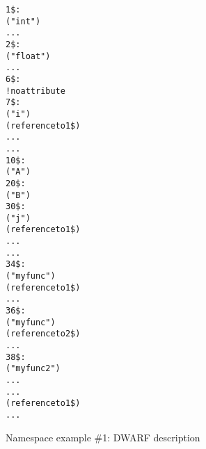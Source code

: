 \begin{figure}[p]
\begin{dwflisting}
\begin{alltt}

1\$:  \DWTAGbasetype
        \DWATname("int")
        ...
2\$:  \DWTAGbasetype
        \DWATname("float")
        ...
6\$:  \DWTAGnamespace
        ! no \DWATname attribute
7\$:
        \DWTAGvariable
            \DWATname("i")
            \DWATtype(reference to 1\$)
            \DWATlocation ...
            ...
10\$: \DWTAGnamespace
        \DWATname("A")
20\$:    \DWTAGnamespace
            \DWATname("B")
30\$:        \DWTAGvariable
                \DWATname("j")
                \DWATtype(reference to 1\$)
                \DWATlocation ...
                ...
34\$:        \DWTAGsubprogram
                \DWATname("myfunc")
                \DWATtype(reference to 1\$)
                ...
36\$:        \DWTAGsubprogram
                \DWATname("myfunc")
                \DWATtype(reference to 2\$)
                ...
38\$:        \DWTAGsubprogram
                \DWATname("myfunc2")
                \DWATlowpc ...
                \DWAThighpc ...
                \DWATtype(reference to 1\$)
                ...
\end{alltt}
\end{dwflisting}
\caption{Namespace example \#1: DWARF description}
\label{fig:namespaceexample1dwarfdescription}
\end{figure}

